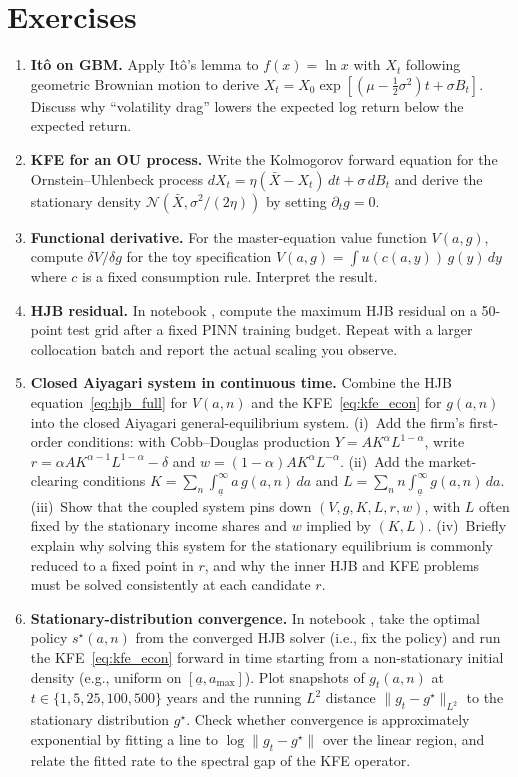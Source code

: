 \documentclass[11pt,a4paper]{report}
\begin{document}
\section*{Exercises}
\begin{enumerate}[itemsep=4pt, leftmargin=*]
\item\label{ex:ch8:1} \textbf{It\^o on GBM.}  Apply It\^o's lemma to $f(x) = \ln x$ with $X_t$ following geometric Brownian motion to derive $X_t = X_0 \exp[(\mu - \tfrac{1}{2}\sigma^2)t + \sigma B_t]$.  Discuss why ``volatility drag'' lowers the expected log return below the expected return.
\item\label{ex:ch8:2} \textbf{KFE for an OU process.}  Write the Kolmogorov forward equation for the Ornstein--Uhlenbeck process $dX_t = \eta(\bar X - X_t)\,dt + \sigma\,dB_t$ and derive the stationary density $\mathcal{N}(\bar X, \sigma^2/(2\eta))$ by setting $\partial_t g = 0$.
\item\label{ex:ch8:3} \textbf{Functional derivative.}  For the master-equation value function $V(a, g)$, compute $\delta V/\delta g$ for the toy specification $V(a,g) = \int u(c(a, y))\,g(y)\,dy$ where $c$ is a fixed consumption rule.  Interpret the result.
\item\label{ex:ch8:4} \textbf{HJB residual.}  In notebook , compute the maximum HJB residual on a 50-point test grid after a fixed PINN training budget.  Repeat with a larger collocation batch and report the actual scaling you observe.
\item\label{ex:ch8:5} \textbf{Closed Aiyagari system in continuous time.}  Combine the HJB equation~\eqref{eq:hjb_full} for $V(a,n)$ and the KFE~\eqref{eq:kfe_econ} for $g(a,n)$ into the closed Aiyagari general-equilibrium system.  (i)~Add the firm's first-order conditions: with Cobb--Douglas production $Y = A K^\alpha L^{1-\alpha}$, write $r = \alpha A K^{\alpha-1} L^{1-\alpha} - \delta$ and $w = (1-\alpha) A K^\alpha L^{-\alpha}$.  (ii)~Add the market-clearing conditions $K = \sum_n\int_{\underline a}^{\infty} a\,g(a,n)\,da$ and $L = \sum_n n\int_{\underline a}^{\infty}g(a,n)\,da$.  (iii)~Show that the coupled system pins down $(V,g,K,L,r,w)$, with $L$ often fixed by the stationary income shares and $w$ implied by $(K,L)$.  (iv)~Briefly explain why solving this system for the stationary equilibrium is commonly reduced to a fixed point in $r$, and why the inner HJB and KFE problems must be solved consistently at each candidate $r$.
\item\label{ex:ch8:6} \textbf{Stationary-distribution convergence.}  In notebook , take the optimal policy $s^\star(a,n)$ from the converged HJB solver (i.e., fix the policy) and run the KFE~\eqref{eq:kfe_econ} forward in time starting from a non-stationary initial density (e.g., uniform on $[\underline a, a_\mathrm{max}]$).  Plot snapshots of $g_t(a, n)$ at $t \in \{1, 5, 25, 100, 500\}$ years and the running $L^2$ distance $\|g_t - g^\star\|_{L^2}$ to the stationary distribution $g^\star$.  Check whether convergence is approximately exponential by fitting a line to $\log\|g_t - g^\star\|$ over the linear region, and relate the fitted rate to the spectral gap of the KFE operator.

\end{enumerate}
\end{document}
